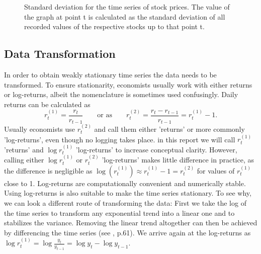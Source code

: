 \begin{figure}[h!]
    \centering
    \begin{adjustbox}{width=.9\textwidth,center}
    
    \end{adjustbox}  
    \caption{Standard deviation for the time series of stock prices. The value of the graph at point t is calculated as the standard deviation of all recorded values of the respective stocks up to that point t.}
    \label{fig:cum_sd_all}
\end{figure}{}

\subsection{Data Transformation}
In order to obtain weakly stationary time series the data needs to be transformed. To ensure stationarity, economists usually work with either returns or log-returns, albeit the nomenclature is sometimes used confusingly. Daily returns can be calculated as
\begin{equation*}
    r^{\scriptscriptstyle{(1)} }_t = \frac{r_t}{r_{t-1}} \qquad \text{or as} \qquad r^{\scriptscriptstyle{(2)}}_t = \frac{r_t - r_{t-1}}{r_{t-1}} = r^{\scriptscriptstyle{(1)}}_t - 1.
\end{equation*}
Usually economists use $r^{\scriptscriptstyle{(2)}}_t$ and call them either 'returns' or more commonly 'log-returns', even though no logging takes place. in this report we will call $r^{\scriptscriptstyle{(1)}}_t$ 'returns' and $\log{r^{\scriptscriptstyle{(1)}}_t}$ 'log-returns' to increase conceptual clarity. However, calling either $\log{r^{\scriptscriptstyle{(1)}}_t}$ or $r^{\scriptscriptstyle{(2)}}_t$ 'log-returns' makes little difference in practice, as the difference is negligible as $ \log(r^{\scriptscriptstyle{(1)}}_t) \approx r^{\scriptscriptstyle{(1)}}_t - 1 = r^{\scriptscriptstyle{(2)}}_t$ for values of $r^{\scriptscriptstyle{(1)}}_t$ close to 1. Log-returns are computationally convenient and numerically stable. Using log-returns is also suitable to make the time series stationary. To see why, we can look a different route of transforming the data: First we take the log of the time series to transform any exponential trend into a linear one and to stabilizes the variance. Removing the linear trend altogether can then be achieved by differencing the time series (see \cite{shumway_time_2011}, p.61). We arrive again at the log-returns as $ \log{r^{\scriptscriptstyle{(1)}}_t} = \log{\frac{y_t}{y_{t-1}}} = \log{y_t} - \log{y_{t-1}} $.

